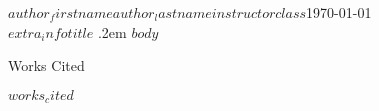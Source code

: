 \documentclass[12pt,letterpaper]{article}
\newenvironment{hangingpar}[1]
  {\begin{list}
          {}
          {\setlength{\itemindent}{-#1}%
           \setlength{\leftmargin}{#1}%
           \setlength{\itemsep}{0pt}%
           \setlength{\parsep}{\parskip}%
           \setlength{\topsep}{\parskip}%
           }
    \setlength{\parindent}{-#1}%
    \item[]
  }
  {\end{list}}
\begin{document}
\begin{mla}{$author_firstname$}{$author_lastname$}{$instructor$}{$class$}{\today\\$extra_info$}{$title$}
\openup .2em
$body$
\pagebreak
\begin{center}
Works Cited
\end{center}
\begin{hangingpar}{0.5in}
$works_cited$
\end{hangingpar}
\end{mla}
\end{document}
